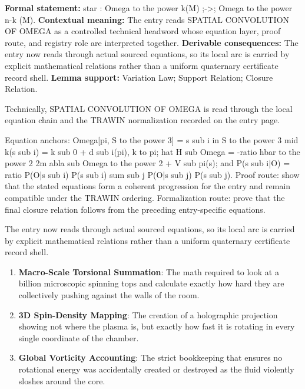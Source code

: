 \begingroup\footnotesize\setlength{\emergencystretch}{3em}\sloppy
\textbf{Formal statement:} star : Omega to the power k(M) ;->; Omega to the power n-k (M). \textbf{Contextual meaning:} The entry reads SPATIAL CONVOLUTION OF OMEGA as a controlled technical headword whose equation layer, proof route, and registry role are interpreted together. \textbf{Derivable consequences:} The entry now reads through actual sourced equations, so its local arc is carried by explicit mathematical relations rather than a uniform quaternary certificate record shell. \textbf{Lemma support:} Variation Law; Support Relation; Closure Relation.\par
\endgroup

Technically, SPATIAL CONVOLUTION OF OMEGA is read through the local equation chain and the TRAWIN normalization recorded on the entry page.

Equation anchors: Omega[pi, S to the power 3] = s sub i in S to the power 3 mid k(s sub i) = k sub 0 + d sub i(pi), k to pi; hat H sub Omega = -ratio hbar to the power 2 2m abla sub Omega to the power 2 + V sub pi(s); and P(s sub i|O) = ratio P(O|s sub i) P(s sub i) sum sub j P(O|s sub j) P(s sub j). Proof route: show that the stated equations form a coherent progression for the entry and remain compatible under the TRAWIN ordering. Formalization route: prove that the final closure relation follows from the preceding entry-specific equations.

The entry now reads through actual sourced equations, so its local arc is carried by explicit mathematical relations rather than a uniform quaternary certificate record shell.
\endgroup

\begin{enumerate}[leftmargin=1.6em,itemsep=6pt,topsep=4pt]
\item \textbf{Macro-Scale Torsional Summation}: The math required to look at a billion microscopic spinning tops and calculate exactly how hard they are collectively pushing against the walls of the room.
\item \textbf{3D Spin-Density Mapping}: The creation of a holographic projection showing not where the plasma is, but exactly how fast it is rotating in every single coordinate of the chamber.
\item \textbf{Global Vorticity Accounting}: The strict bookkeeping that ensures no rotational energy was accidentally created or destroyed as the fluid violently sloshes around the core.
\end{enumerate}


